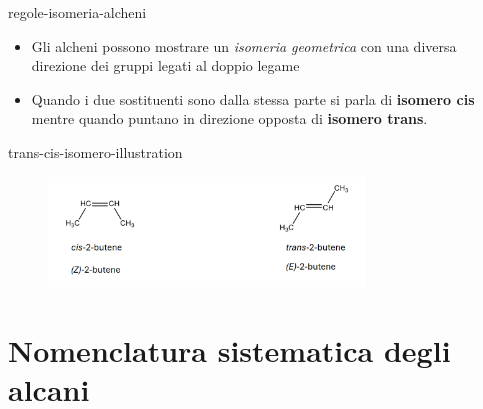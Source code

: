 \documentclass[preview]{standalone}
\begin{document}
\begin{snippet}{regole-isomeria-alcheni}
    \begin{itemize}
        \item Gli alcheni possono mostrare un \textit{isomeria geometrica} con una diversa direzione dei gruppi
        legati al doppio legame
        \item Quando i due sostituenti sono dalla stessa parte si parla di \textbf{isomero cis} mentre quando
        puntano in direzione opposta di \textbf{isomero trans}.
    \end{itemize}
\end{snippet}

\begin{snippet}{trans-cis-isomero-illustration}
    \begin{center}
    \begin{figure}
        \includegraphics[width=0.75\textwidth]{./resources/trans_cis_isomero.png}
    \end{figure}
    \end{center}
\end{snippet}

\section{Nomenclatura sistematica degli alcani}

\end{document}
